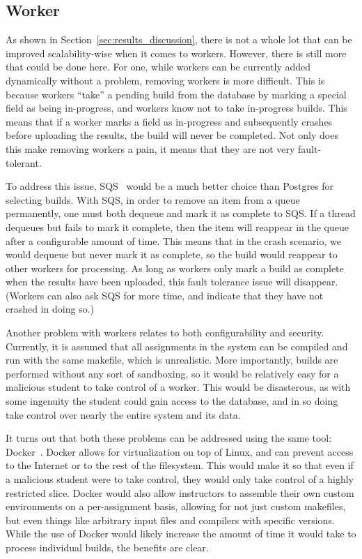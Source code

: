 \documentclass{scrartcl}
\begin{document}
\subsection{Worker}
\label{sec:improve_worker}

As shown in Section~\ref{sec:results_discussion}, there is not a whole lot that can be improved scalability-wise when it comes to workers.
However, there is still more that could be done here.
For one, while workers can be currently added dynamically without a problem, removing workers is more difficult.
This is because workers ``take'' a pending build from the database by marking a special field as being in-progress, and workers know not to take in-progress builds.
This means that if a worker marks a field as in-progress and subsequently crashes before uploading the results, the build will never be completed.
Not only does this make removing workers a pain, it means that they are not very fault-tolerant.

To address this issue, SQS~\cite{sqs} would be a much better choice than Postgres for selecting builds.
With SQS, in order to remove an item from a queue permanently, one must both dequeue and mark it as complete to SQS.
If a thread dequeues but fails to mark it complete, then the item will reappear in the queue after a configurable amount of time.
This means that in the crash scenario, we would dequeue but never mark it as complete, so the build would reappear to other workers for processing.
As long as workers only mark a build as complete when the results have been uploaded, this fault tolerance issue will disappear.
(Workers can also ask SQS for more time, and indicate that they have not crashed in doing so.)

Another problem with workers relates to both configurability and security.
Currently, it is assumed that all assignments in the system can be compiled and run with the same makefile, which is unrealistic.
More importantly, builds are performed without any sort of sandboxing, so it would be relatively easy for a malicious student to take control of a worker.
This would be disasterous, as with some ingenuity the student could gain access to the database, and in so doing take control over nearly the entire system and its data.

It turns out that both these problems can be addressed using the same tool: Docker~\cite{docker}.
Docker allows for virtualization on top of Linux, and can prevent access to the Internet or to the rest of the filesystem.
This would make it so that even if a malicious student were to take control, they would only take control of a highly restricted slice.
Docker would also allow instructors to assemble their own custom environments on a per-assignment basis, allowing for not just custom makefiles, but even things like arbitrary input files and compilers with specific versions.
While the use of Docker would likely increase the amount of time it would take to process individual builds, the benefits are clear.
\end{document}
